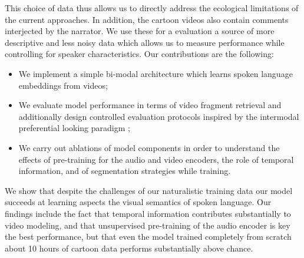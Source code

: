 This choice of data thus allows us to
directly address the ecological limitations of the current
approaches. In addition, the cartoon videos also contain comments
interjected by the narrator. We use these for a evaluation a source of
more descriptive and less noisy data which allows us to measure
performance while controlling for speaker characteristics.
Our contributions are the following:
\begin{itemize}
\item We implement a simple bi-modal architecture which learns
  spoken language embeddings from videos;
\item We evaluate model performance in terms of video fragment
  retrieval and additionally design controlled evaluation
  protocols inspired by the intermodal preferential looking
  paradigm \citep{hirsh1996intermodal};
\item We carry out ablations of model components in order to
  understand the effects of pre-training for the audio and video
  encoders, the role of temporal information, and of segmentation
  strategies while training. 
\end{itemize}
We show that despite the challenges of our naturalistic training data
our model succeeds at learning aspects the visual semantics of spoken
language. Our findings include the fact that temporal information
contributes substantially to video modeling, and that unsupervised
pre-training of the audio encoder is key the best performance, but that
even the model trained completely from scratch about 10 hours of
cartoon data performs substantially above chance.




